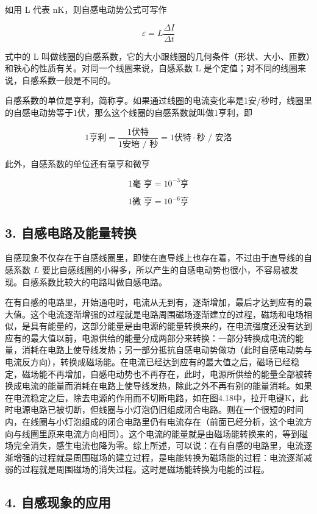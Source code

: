 如用 L 代表 nK，则自感电动势公式可写作

\[
\varepsilon = L \frac{\Delta I}{\Delta t} \tag{4.5}
\]

式中的 L
叫做线圈的自感系数，它的大小跟线圈的几何条件（形状、大小、匝数）和铁心的性质有关。对同一个线圈来说，自感系数
L 是个定值；对不同的线圈来说，自感系数一般是不同的。

自感系数的单位是亨利，简称亨。如果通过线圈的电流变化率是1安/秒时，线圈里的自感电动势等于1伏，那么这个线圈的自感系数就叫做1亨利，即

\[
1 \text{亨利} = \frac{1 \text{伏特}}{1 \text{安培 / 秒}} = 1 \text{伏特} \cdot \text{秒 / 安洛}
\]

此外，自感系数的单位还有毫亨和微亨

\[
1 \text{毫 亨} = 10^{- 3} \text{亨}
\]

\[
1 \text{微 亨} = 10^{- 6} \text{亨}
\]

\subsection{3.
自感电路及能量转换}\label{ux81eaux611fux7535ux8defux53caux80fdux91cfux8f6cux6362}

自感现象不仅存在于自感线圈里，即使在直导线上也存在着，不过由于直导线的自感系数
\(L\)
要比自感线圈的小得多，所以产生的自感电动势也很小，不容易被发现。自感系数比较大的电路叫做自感电路。

在有自感的电路里，开始通电时，电流从无到有，逐渐增加，最后才达到应有的最大值。这个电流逐渐增强的过程就是电路周围磁场逐渐建立的过程，磁场和电场相似，是具有能量的，这部分能量是由电源的能量转换来的，在电流强度还没有达到应有的最大值以前，电源供给的能量分成两部分来转换：一部分转换成电流的能量，消耗在电路上使导线发热；另一部分抵抗自感电动势做功（此时自感电动势与电流反方向），转换成磁场能。在电流已经达到应有的最大值之后，磁场已经稳定，磁场能不再增加，自感电动势也不再存在，此时，电源所供给的能量全部被转换成电流的能量而消耗在电路上使导线发热，除此之外不再有别的能量消耗。如果在电流稳定之后，除去电源的作用而不切断电路，如在图4.18中，拉开电键K，此时电源电路已被切断，但线圈与小灯泡仍旧组成闭合电路。则在一个很短的时间内，在线圈与小灯泡组成的闭合电路里仍有电流存在（前面已经分析，这个电流方向与线圈里原来电流方向相同）。这个电流的能量就是由磁场能转换来的，等到磁场完全消失，感生电流也降为零。综上所述，可以说：在有自感的电路里，电流逐渐增强的过程就是周围磁场的建立过程，是电能转换为磁场能的过程：电流逐渐减弱的过程就是周围磁场的消失过程。这时是磁场能转换为电能的过程。

\subsection{4.
自感现象的应用}\label{ux81eaux611fux73b0ux8c61ux7684ux5e94ux7528}

